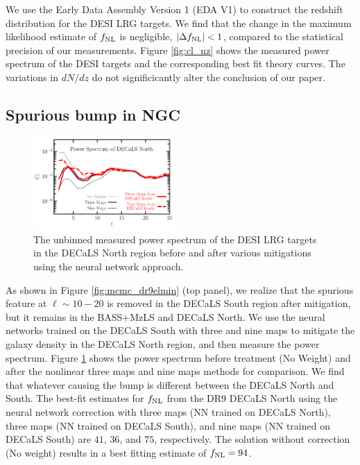 We use the Early Data Assembly Version 1 (EDA V1) to construct the redshift distribution for the DESI LRG targets. We find that the change in the maximum likelihood estimate of $f_{\rm NL}$ is negligible, $|\Delta f_{\rm NL} | < 1$, compared to the statistical precision of our measurements. Figure \ref{fig:cl_nz} shows the measured power spectrum of the DESI targets and the corresponding best fit theory curves. The variations in $dN/dz$ do not significicantly alter the conclusion of our paper.

\subsection{Spurious bump in NGC}\label{ssec:ndecalsbump}

\begin{figure}
    \centering
    \includegraphics[width=0.48\textwidth]{figures/cl_SonN.pdf}
    \caption{The unbinned measured power spectrum of the DESI LRG targets in the DECaLS North region before and after various mitigations using the neural network approach.}
    \label{fig:clSonN}
\end{figure}

As shown in Figure \ref{fig:mcmc_dr9elmin} (top panel), we realize that the spurious feature at $\ell \sim 10-20$ is removed in the DECaLS South region after mitigation, but it remains in the BASS+MzLS and DECaLS North. We use the neural networks trained on the DECaLS South with three and nine maps to mitigate the galaxy density in the DECaLS North region, and then measure the power spectrum. Figure \ref{fig:clSonN} shows the power spectrum before treatment (No Weight) and after the nonlinear three maps and nine maps methods for comparison. We find that whatever causing the bump is different between the DECaLS North and South. The best-fit estimates for $f_{\rm NL}$ from the DR9 DECaLS North using the neural network correction with three maps (NN trained on DECaLS North), three maps (NN trained on DECaLS South), and nine maps (NN trained on DECaLS South) are $41$, $36$, and $75$, respectively. The solution without correction (No weight) results in a best fitting estimate of $f_{\rm NL}=94$.


